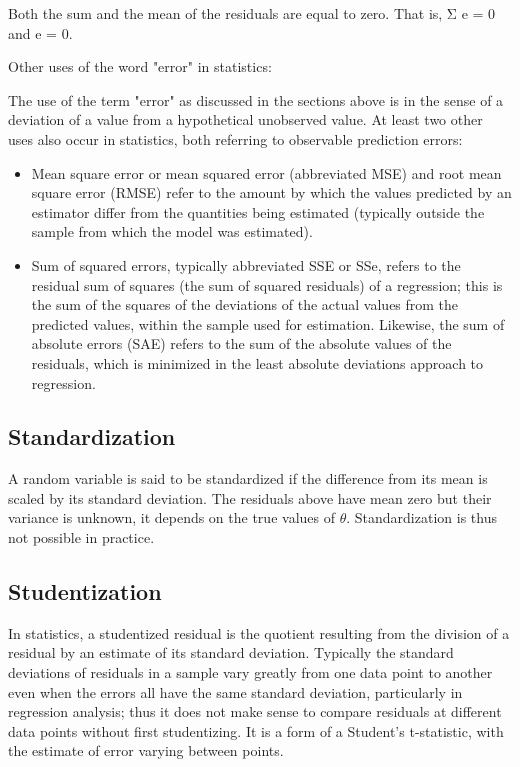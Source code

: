 \documentclass[Main.tex]{subfiles}
\begin{document}
Both the sum and the mean of the residuals are equal to zero. That is, Σ e = 0 and e = 0.







Other uses of the word "error" in statistics: 

The use of the term "error" as discussed in the sections above is in the sense of a deviation of a value from a hypothetical unobserved value. At least two other uses also occur in statistics, both referring to observable prediction errors:

\begin{itemize}
	\item Mean square error or mean squared error (abbreviated MSE) and root mean square error (RMSE) refer to the amount by which the values predicted by an estimator differ from the quantities being estimated (typically outside the sample from which the model was estimated).
	
	\item 
	Sum of squared errors, typically abbreviated SSE or SSe, refers to the residual sum of squares (the sum of squared residuals) of a regression; this is the sum of the squares of the deviations of the actual values from the predicted values, within the sample used for estimation. Likewise, the sum of absolute errors (SAE) refers to the sum of the absolute values of the residuals, which is minimized in the least absolute deviations approach to regression.
	
\end{itemize}



	\subsection{Standardization} %
	
	A random variable is said to be standardized if the difference from its mean is scaled by its standard deviation. The residuals above have mean zero but their variance is unknown, it depends on the true values of $\theta$. Standardization is thus not possible in practice.
	
\subsection{Studentization}
In statistics, a studentized residual is the quotient resulting from the division of a residual by an estimate of its standard deviation. Typically the standard deviations of residuals in a sample vary greatly from one data point to another even when the errors all have the same standard deviation, particularly in regression analysis; thus it does not make sense to compare residuals at different data points without first studentizing. It is a form of a Student's t-statistic, with the estimate of error varying between points.
\end{document}
